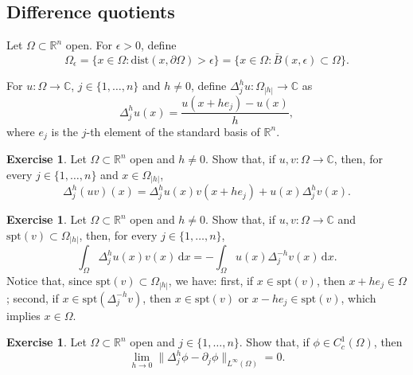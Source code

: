 \documentclass[a4paper,9pt]{amsart}
\newcommand{\R}{\mathbb{R}}	%
\newcommand{\C}{\mathbb{C}}	%
\newcommand{\did}{\,\mathrm{d}}	%
\newcommand{\de}{\partial}		%
\newcommand{\dist}{\mathrm{dist}}
\newcommand{\spt}{\mathrm{spt}}
\theoremstyle{plain}
\theoremstyle{definition}
\newtheorem{exercise}[proposition]{Exercise}%
\theoremstyle{remark}
\begin{document}
\subsection{Difference quotients}
Let $\Omega\subset\R^n$ open.
For $\epsilon>0$, define
\begin{equation}
	\Omega_{\epsilon} = \{x\in\Omega: \dist(x,\de\Omega)>\epsilon\}
	= \{x\in\Omega: \bar B(x,\epsilon) \subset\Omega\}. 
\end{equation}

For $u:\Omega\to\C$, $j\in\{1,\dots,n\}$ and $h\neq0$, define $\Delta_j^hu:\Omega_{|h|}\to\C$ as
\begin{equation}
	\Delta_j^hu(x) = \frac{u(x+he_j) - u(x)}{h} ,
\end{equation}
where $e_j$ is the $j$-th element of the standard basis of $\R^n$.

\begin{exercise}
	Let $\Omega\subset\R^n$ open and $h\neq0$.
	Show that, if $u,v:\Omega\to\C$, then, for every $j\in\{1,\dots,n\}$ and $x\in\Omega_{|h|}$,
	\begin{equation}\label{eq681734d8}
		\Delta_j^h(uv)(x) = \Delta_j^hu(x) v(x+he_j) + u(x)\Delta_j^hv(x) . 
	\end{equation}
\end{exercise}
\begin{exercise}
	Let $\Omega\subset\R^n$ open and $h\neq0$.
	Show that, if $u,v:\Omega\to\C$ and $\spt(v)\subset\Omega_{|h|}$, then,
	for every $j\in\{1,\dots,n\}$,
	\begin{equation}\label{eq681734d2}
		\int_\Omega \Delta_j^h u(x)  v(x) \did x 
		= - \int_\Omega u(x)\Delta_j^{-h}v(x) \did x .
	\end{equation}
	Notice that, since $\spt(v)\subset\Omega_{|h|}$, 
	we have: first, if $x\in\spt(v)$, then $x+he_j\in\Omega$;
	second, if $x\in\spt(\Delta_j^{-h}v)$, then $x\in\spt(v)$ or $x-he_j\in\spt(v)$, which implies $x\in\Omega$.
\end{exercise}

\begin{exercise}
	Let $\Omega\subset\R^n$ open and $j\in\{1,\dots,n\}$.
	Show that, if $\phi\in C^1_c(\Omega)$, then
	\begin{equation}\label{eq6817354b}
		\lim_{h\to0} \|\Delta_j^h\phi - \de_j\phi\|_{L^\infty(\Omega)} = 0 .
	\end{equation}
\end{exercise}
\end{document}
